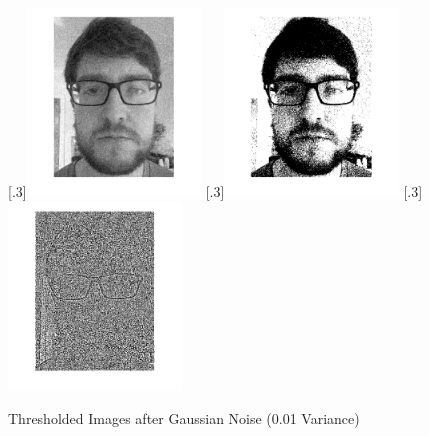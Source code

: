 \documentclass[a4paper]{article}
\begin{document}
	\begin{figure}[H]
		\centering
		[.3\linewidth]{\includegraphics[height=5cm]{Results/Q1/d/qdVar001.jpg}}%
		[.3\linewidth]{\includegraphics[height=5cm]{Results/Q1/d/qdThresh001.jpg}}%
		[.3\linewidth]{\includegraphics[height=5cm]{Results/Q1/d/qd5x5001.jpg}}%
		\caption{Thresholded Images after Gaussian Noise (0.01 Variance)}
		\label{fig:}
	\end{figure}
\end{document}
